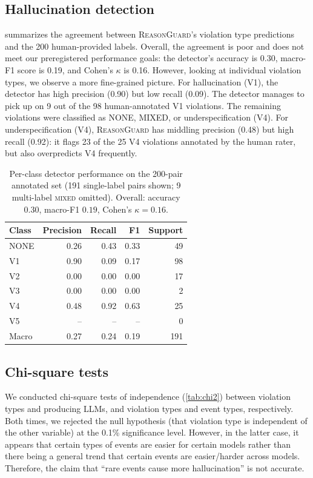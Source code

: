 \documentclass[conference]{IEEEtran}
\newcommand{\rg}{\textsc{ReasonGuard}}
\begin{document}
\subsection{Hallucination detection}
 summarizes the agreement between \rg's violation type predictions and the 200 human-provided labels. Overall, the agreement is poor and does not meet our preregistered performance goals: the detector's accuracy is 0.30, macro-F1 score is 0.19, and Cohen's $\kappa$ is 0.16. However, looking at individual violation types, we observe a more fine-grained picture. For hallucination (V1), the detector has high precision (0.90) but low recall (0.09). The detector manages to pick up on 9 out of the 98 human-annotated V1 violations. The remaining violations were classified as NONE, MIXED, or underspecification (V4). For underspecification (V4), \rg{} has middling precision (0.48) but high recall (0.92): it flags 23 of the 25 V4 violations annotated by the human rater, but also overpredicts V4 frequently.

\begin{table}[t]
\centering
\caption{Per-class detector performance on the 200-pair annotated set (191 single-label pairs shown; 9 multi-label \textsc{mixed} omitted). Overall: accuracy $0.30$, macro-F1 $0.19$, Cohen's $\kappa=0.16$.}
\label{tab:perclass}
\begin{tabular}{@{}lrrrr@{}}
\toprule
Class & Precision & Recall & F1 & Support \\
\midrule
NONE & 0.26 & 0.43 & 0.33 & 49 \\
V1   & 0.90 & 0.09 & 0.17 & 98 \\
V2   & 0.00 & 0.00 & 0.00 & 17 \\
V3   & 0.00 & 0.00 & 0.00 & 2  \\
V4   & 0.48 & 0.92 & 0.63 & 25 \\
V5   & --   & --   & --   & 0  \\
\midrule
Macro & 0.27 & 0.24 & 0.19 & 191 \\
\bottomrule
\end{tabular}
\end{table}

\subsection{Chi-square tests}
We conducted chi-square tests of independence (\cref{tab:chi2}) between violation types and producing LLMs, and violation types and event types, respectively. Both times, we rejected the null hypothesis (that violation type is independent of the other variable) at the 0.1\% significance level. However, in the latter case, it appears that certain types of events are easier for certain models rather than there being a general trend that certain events are easier/harder across models. Therefore, the claim that ``rare events cause more hallucination'' is not accurate.
\end{document}
